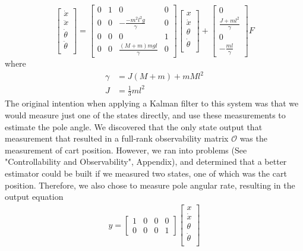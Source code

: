\documentclass{article}
\begin{document}
\begin{equation}
\begin{bmatrix}
	\dot{x} \\
	\ddot{x} \\
	\dot{\theta} \\
	\ddot{\theta} \\
\end{bmatrix} = \begin{bmatrix}
0 & 1 & 0 & 0 \\
0 & 0 & -\frac{-m^2l^2g}{\gamma} & 0 \\
0 & 0 & 0 & 1\\
0 & 0 & \frac{(M+m)mgl}{\gamma} & 0
\end{bmatrix} \begin{bmatrix}
	x \\
	\dot{x} \\
	\theta \\
	\dot{\theta} \\
\end{bmatrix}  + \begin{bmatrix}
0 \\
\frac{J+ml^2}{\gamma} \\
0 \\
-\frac{ml}{\gamma}
\end{bmatrix} F
\label{eq:ss_continuous}
\end{equation}
where 
\begin{align*}
\gamma &= J(M+m)+mMl^2 \\
J &= \frac{1}{3}ml^2
\end{align*}
The original intention when applying a Kalman filter to this system was that we would measure just one of the states directly, and use these measurements to estimate the pole angle. We discovered that the only state output that measurement that resulted in a full-rank observability matrix $\mathcal{O}$ was the measurement of cart position. However, we ran into problems (See "Controllability and Observability", Appendix), and determined that a better estimator could be built if we measured two states, one of which was the cart position. Therefore, we also chose to measure pole angular rate, resulting in the output equation
\begin{align}
y = \begin{bmatrix}
1 & 0 & 0 & 0 \\
0 & 0 & 0 & 1
\end{bmatrix} \begin{bmatrix}
	x \\
	\dot{x} \\
	\theta \\
	\dot{\theta} \\
\end{bmatrix}
\label{eq:1output}
\end{align}
\end{document}
